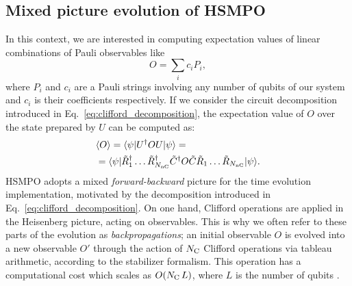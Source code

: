 \documentclass[pra,aps,twocolumn,longbibliography,preprintnumbers,superscriptaddress,nofootnotebib,10pt]{revtex4-2}
\newcommand{\numqubits}{L}  %
\newcommand{\numcliff}{{N_{\rm C}}} %
\newcommand{\nummagic}{{N_{\rm nC}}} %
\newcommand{\numrotdecomp}{\nummagic}
\begin{document}
\subsection{Mixed picture evolution of HSMPO}\label{sec:mixed_pict}

In this context, we are interested in computing expectation values of linear combinations of Pauli observables like
\begin{equation}
O = \sum_i c_i P_i,
\end{equation}
where $P_i$ and $c_i$ are a Pauli strings involving any number of qubits of our system and $c_i$ is their coefficients respectively. If we consider the circuit decomposition introduced in Eq.~\eqref{eq:clifford_decomposition}, the expectation value of $O$ over the state prepared by $U$ can be computed as:
\begin{equation}
\begin{split}
&\langle O \rangle = \langle \psi | U^\dagger O U |\psi\rangle = \\
&= \langle \psi | \tilde{R}_1^\dagger \dots \tilde{R}_\numrotdecomp^\dagger \tilde{C}^\dagger O \tilde{C} \tilde{R}_1 \dots \tilde{R}_\numrotdecomp |\psi\rangle.
\label{eq:expectation}
\end{split}
\end{equation}
HSMPO adopts a mixed \textit{forward-backward} picture for the time evolution implementation, motivated by the decomposition introduced in Eq.~\eqref{eq:clifford_decomposition}.
On one hand, Clifford operations are applied in the Heisenberg picture, acting on observables. This is why we often refer to
these parts of the evolution as \textit{backpropagations}; an initial observable $O$ is evolved into a new observable $O'$ through the action of $\numcliff$ Clifford operations via tableau arithmetic, according to the stabilizer formalism. This operation has a computational cost which scales as $O(\numcliff\,\numqubits)$, where $\numqubits$ is the number of qubits \cite{Aaronson_2004, Gidney2021stimfaststabilizer}.
\end{document}
